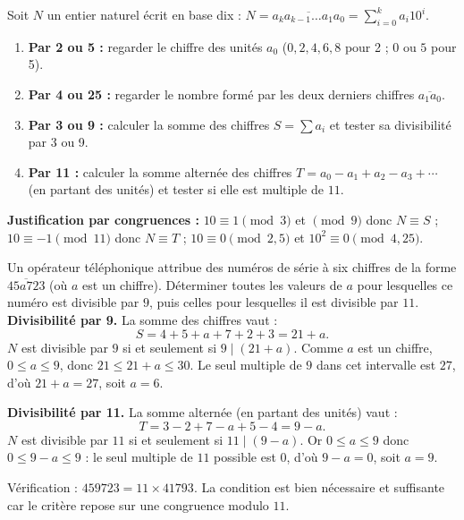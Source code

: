 \documentclass[11pt]{article}
\begin{document}
\begin{methode}
Soit $N$ un entier naturel écrit en base dix : $N = \overline{a_k a_{k-1} \dots a_1 a_0} = \sum_{i=0}^k a_i 10^i$.
\begin{enumerate}
\item \textbf{Par 2 ou 5 :} regarder le chiffre des unités $a_0$ ($0, 2, 4, 6, 8$ pour 2 ; $0$ ou $5$ pour 5).
\item \textbf{Par 4 ou 25 :} regarder le nombre formé par les deux derniers chiffres $\overline{a_1 a_0}$.
\item \textbf{Par 3 ou 9 :} calculer la somme des chiffres $S = \sum a_i$ et tester sa divisibilité par 3 ou 9.
\item \textbf{Par 11 :} calculer la somme alternée des chiffres $T = a_0 - a_1 + a_2 - a_3 + \cdots$ (en partant des unités) et tester si elle est multiple de $11$.
\end{enumerate}
\textbf{Justification par congruences :} $10 \equiv 1 \pmod{3}$ et $\pmod{9}$ donc $N \equiv S$ ; $10 \equiv -1 \pmod{11}$ donc $N \equiv T$ ; $10 \equiv 0 \pmod{2,5}$ et $10^2 \equiv 0 \pmod{4,25}$.
\end{methode}

\begin{exoresolu}
Un opérateur téléphonique attribue des numéros de série à six chiffres de la forme $\overline{45a723}$ (où $a$ est un chiffre). Déterminer toutes les valeurs de $a$ pour lesquelles ce numéro est divisible par $9$, puis celles pour lesquelles il est divisible par $11$.
\tcblower
\textbf{Divisibilité par 9.} La somme des chiffres vaut :
\[ S = 4 + 5 + a + 7 + 2 + 3 = 21 + a. \]
$N$ est divisible par $9$ si et seulement si $9 \mid (21 + a)$. Comme $a$ est un chiffre, $0 \leq a \leq 9$, donc $21 \leq 21 + a \leq 30$. Le seul multiple de $9$ dans cet intervalle est $27$, d'où $21 + a = 27$, soit $\boxed{a = 6}$.

\textbf{Divisibilité par 11.} La somme alternée (en partant des unités) vaut :
\[ T = 3 - 2 + 7 - a + 5 - 4 = 9 - a. \]
$N$ est divisible par $11$ si et seulement si $11 \mid (9 - a)$. Or $0 \leq a \leq 9$ donc $0 \leq 9 - a \leq 9$ : le seul multiple de $11$ possible est $0$, d'où $9 - a = 0$, soit $\boxed{a = 9}$.

Vérification : $459723 = 11 \times 41793$. La condition est bien nécessaire et suffisante car le critère repose sur une congruence modulo $11$.
\end{exoresolu}
\end{document}
